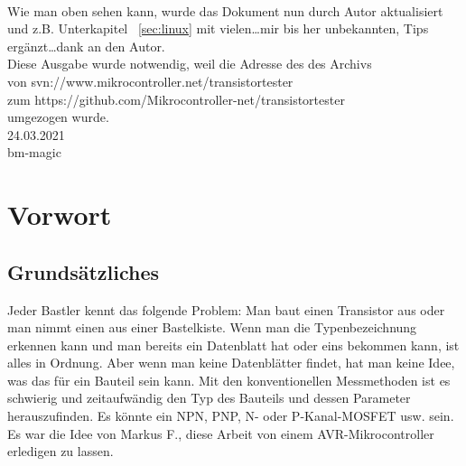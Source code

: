 \\Wie man oben sehen kann, wurde das Dokument nun durch Autor aktualisiert und z.B. Unterkapitel ~\ref{sec:linux} mit
vielen\dots mir bis her unbekannten, Tips ergänzt\dots dank an den Autor.
\\Diese Ausgabe wurde notwendig, weil die Adresse des  des  Archivs
\\von svn://www.mikrocontroller.net/transistortester
\\ zum https://github.com/Mikrocontroller-net/transistortester ~\cite{tt}
\\ umgezogen wurde.
\vspace*{0.2cm}
\\24.03.2021 
\\ bm-magic


\newpage
\section*{Vorwort}

\subsection*{Grundsätzliches}
Jeder Bastler kennt das folgende Problem: Man baut einen Transistor aus oder man nimmt einen aus einer Bastelkiste.
Wenn man die Typenbezeichnung erkennen kann und man bereits ein Datenblatt hat oder eins bekommen kann, ist alles in Ordnung.
Aber wenn man keine Datenblätter findet, hat man keine Idee, was das für ein Bauteil sein kann.
Mit den konventionellen Messmethoden ist es schwierig und zeitaufwändig den Typ des Bauteils und dessen Parameter herauszufinden.
Es könnte ein NPN, PNP, N- oder P-Kanal-MOSFET usw. sein. 
Es war die Idee von Markus F., diese Arbeit von einem AVR-Mikrocontroller erledigen zu lassen.

